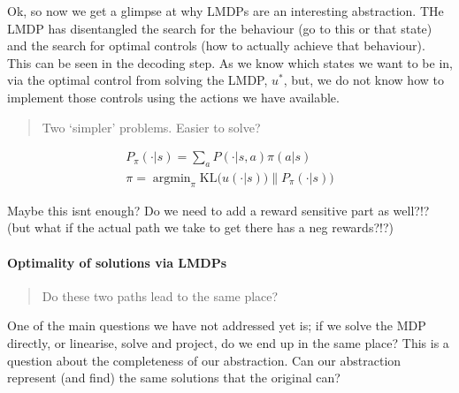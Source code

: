 Ok, so now we get a glimpse at why LMDPs are an interesting abstraction.
THe LMDP has disentangled the search for the behaviour (go to this or
that state) and the search for optimal controls (how to actually achieve
that behaviour). This can be seen in the decoding step. As we know which
states we want to be in, via the optimal control from solving the LMDP,
\(u^{* }\), but, we do not know how to implement those controls using
the actions we have available.

\begin{quote}
Two `simpler' problems. Easier to solve?
\end{quote}

\begin{align}
P_{\pi}(\cdot | s) = \sum_a P(\cdot | s, a) \pi(a | s) \\
\pi = \mathop{\text{argmin}}_{\pi} \text{KL}\Big(u(\cdot | s))\parallel P_{\pi}(\cdot | s)\Big)
\end{align}

Maybe this isnt enough? Do we need to add a reward sensitive part as
well?!? (but what if the actual path we take to get there has a neg
rewards?!?)

\hypertarget{optimality-of-solutions-via-lmdps}{%
\paragraph{Optimality of solutions via
LMDPs}\label{optimality-of-solutions-via-lmdps}}

\begin{quote}
Do these two paths lead to the same place?
\end{quote}

One of the main questions we have not addressed yet is; if we solve the
MDP directly, or linearise, solve and project, do we end up in the same
place? This is a question about the completeness of our abstraction. Can
our abstraction represent (and find) the same solutions that the
original can?


